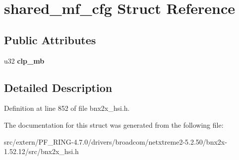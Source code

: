 \hypertarget{structshared__mf__cfg}{
\section{shared\_\-mf\_\-cfg Struct Reference}
\label{structshared__mf__cfg}
}
\subsection*{Public Attributes}
\begin{DoxyCompactItemize}
\item 
\hypertarget{structshared__mf__cfg_ae30e0fe505afe93f5691537c4493a737}{
u32 {\bfseries clp\_\-mb}}
\label{structshared__mf__cfg_ae30e0fe505afe93f5691537c4493a737}

\end{DoxyCompactItemize}


\subsection{Detailed Description}


Definition at line 852 of file bnx2x\_\-hsi.h.



The documentation for this struct was generated from the following file:\begin{DoxyCompactItemize}
\item 
src/extern/PF\_\-RING-\/4.7.0/drivers/broadcom/netxtreme2-\/5.2.50/bnx2x-\/1.52.12/src/bnx2x\_\-hsi.h\end{DoxyCompactItemize}
